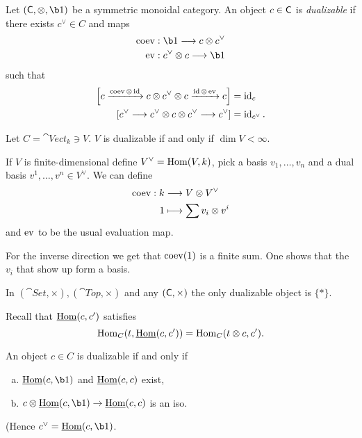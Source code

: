 \begin{definition}
	Let $(\C, \otimes, \b1)$ be a symmetric monoidal category. An object $c\in \mathsf{C}$ is \emph{dualizable} if there exists $c^{\vee}\in C$ and maps
	\begin{align*}
		\coev &: \b1 \to c\otimes c^{\vee} \\
		\ev &: c^{\vee}\otimes c \to \b1
	\end{align*}
	such that
	\begin{align*}
		\left[ c \xrightarrow{\coev \otimes \id} c \otimes c^{\vee}\otimes c \xrightarrow{\id\otimes \ev} c \right] &= \id_{c} \\
		\left[ c^{\vee}\to c^{\vee}\otimes c\otimes c^{\vee}\to c^{\vee} \right] &= \id_{c^{\vee}}
	.\end{align*}
\end{definition}
\begin{example}
	Let $C=\cat{Vect}_k\ni V$. $V$ is dualizable if and only if $\dim V<\infty$.

	If $V$ is finite-dimensional define $V^{\vee} = \operatorname{Hom}(V,k)$, pick a basis $v_1,\dots,v_n$ and a dual basis $v^{1},\dots,v^{n}\in V^{\vee}$. We can define
	\begin{align*}
		\operatorname{coev}: k &\longrightarrow V\otimes V^{\vee} \\
		1 &\longmapsto \sum v_i\otimes v^{i}
	\end{align*}
	and $\operatorname{ev}$ to be the usual evaluation map.

	For the inverse direction we get that $\operatorname{coev}(1)$ is a finite sum. One shows that the $v_i$ that show up form a basis.
\end{example}
\begin{example}
	In $(\cat{Set},\times ), (\cat{Top}, \times )$ and any $(\mathsf{C},\times )$ the only dualizable object is $\{*\} $.
\end{example}
Recall that $\underline{\operatorname{Hom}}(c,c')$ satisfies
\[
	\operatorname{Hom}_C(t,\underline{\operatorname{Hom}}(c,c')) = \operatorname{Hom}_C(t\otimes c,c')
.\] 
\begin{corollary}
	An object $c\in C$ is dualizable if and only if
	\begin{enumerate}[a)]
		\item $\iHom(c,\b1)$ and  $\underline{\operatorname{Hom}}(c,c)$ exist,
		\item $c\otimes \iHom(c,\b1)\to \iHom(c,c)$ is an iso.
	\end{enumerate}
	(Hence $c^{\vee} = \iHom(c,\b1)$.
\end{corollary}
